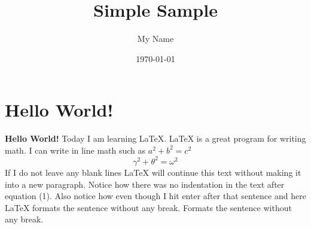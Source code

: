 \documentclass{article}
\title{Simple Sample}
\author{My Name}
\date{\today}
\begin{document}
\maketitle

\section{Hello World!}

\textbf{Hello World!} Today I am learning \LaTeX.
\LaTeX{} is a great program for writing math. I can write in line math such as \(a^2+b^2=c^2\)
\begin{equation}
    \gamma^2+\theta^2=\omega^2
\end{equation}
If I do not leave any blank lines \LaTeX{} will continue  this text without making it into a new paragraph.  Notice how there was no indentation in the text after equation (1).
Also notice how even though I hit enter after that sentence and here \LaTeX{} formats the sentence without any break. Formats the sentence without any break.
\end{document}
